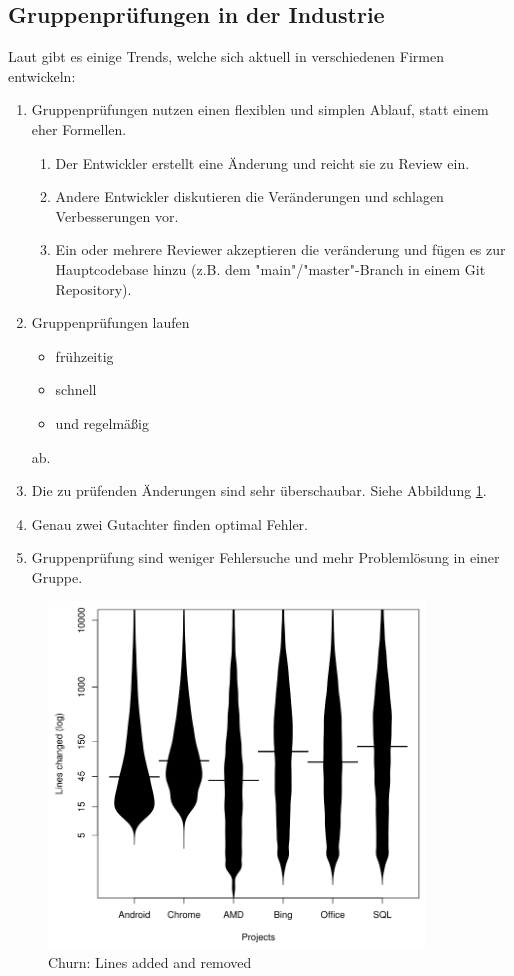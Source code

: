 \documentclass[	%
		fontsize=11pt,  %
		a4paper,	    %
		ngerman,		%
		sans,			%
		f4,				%
	]{HsH-report}		%
\begin{document}
\subsection{Gruppenprüfungen in der Industrie}

Laut \textcite{rigby:review} gibt es einige Trends, welche sich aktuell in
verschiedenen Firmen entwickeln:

\begin{enumerate}
	\item Gruppenprüfungen nutzen einen flexiblen und simplen Ablauf, statt einem eher
	      Formellen. \begin{enumerate}
		      \item Der Entwickler erstellt eine Änderung und reicht sie zu Review ein.
		      \item Andere Entwickler diskutieren die Veränderungen und schlagen Verbesserungen
		            vor.
		      \item Ein oder mehrere Reviewer akzeptieren die veränderung und fügen es zur
		            Hauptcodebase hinzu (z.B. dem "main"/"master"-Branch in einem Git Repository).
	      \end{enumerate}
	\item Gruppenprüfungen laufen \begin{itemize}
		      \item frühzeitig
		      \item schnell
		      \item und regelmäßig
	      \end{itemize}
	      ab.
	\item Die zu prüfenden Änderungen sind sehr überschaubar. Siehe Abbildung
	      \ref{fig:changes}.
	\item Genau zwei Gutachter finden optimal Fehler.
	\item Gruppenprüfung sind weniger Fehlersuche und mehr Problemlösung in einer Gruppe.
\end{enumerate}

\begin{figure}
	\centering
	\includegraphics[width=10cm]{small_code_changes.png}
	\caption{Churn: Lines added and removed \protect\cite{rigby:review}}
	\label{fig:changes}
\end{figure}
\end{document}
